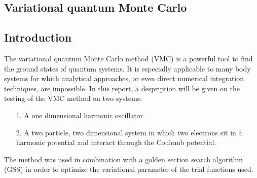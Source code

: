 \documentclass[twocolumn]{article}
\begin{document}
\begin{large}
\section*{Variational quantum Monte Carlo}
\subsection*{Introduction}
The variational quantum Monte Carlo method (VMC) is a powerful tool to find the ground states of quantum systems. It is especially applicable to many body systems for which analytical approaches, or even direct numerical integration techniques, are impossible. In this report, a despription will be given on the testing of the VMC method on two systems:
\begin{itemize}
    \item[1.] A one dimensional harmonic oscillator.
    \item[2.] A two particle, two dimensional system in which two electrons sit in a harmonic potential and interact through the Coulomb potential. 
\end{itemize}
The method was used in combination with a golden section search algorithm (GSS) in order to optimize the variational parameter of the trial functions used.


\end{large}
\end{document}
